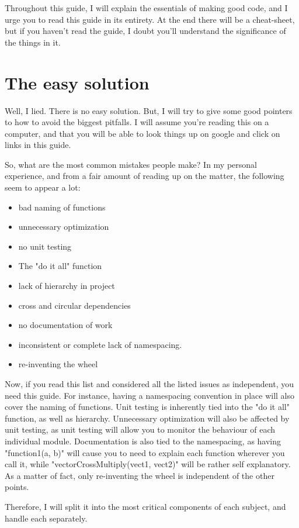 \documentclass[10pt,a4paper]{article}
\begin{document}
Throughout this guide, I will explain the essentials of making good code, and I urge you to read this guide in its entirety. At the end there will be a cheat-sheet, but if you haven't read the guide, I doubt you'll understand the significance of the things in it. 

\section{The easy solution}
Well, I lied. There is no easy solution. But, I will try to give some good pointers to how to avoid the biggest pitfalls. I will assume you're reading this on a computer, and that you will be able to look things up on google and click on links in this guide. 

So, what are the most common mistakes people make? In my personal experience, and from a fair amount of reading up on the matter, the following seem to appear a lot:

\begin{itemize}
\item bad naming of functions
\item unnecessary optimization
\item no unit testing
\item The "do it all" function
\item lack of hierarchy in project
\item cross and circular dependencies
\item no documentation of work
\item inconsistent or complete lack of namespacing.
\item re-inventing the wheel
\end{itemize}


Now, if you read this list and considered all the listed issues as independent, you need this guide. For instance, having a namespacing convention in place will also cover the naming of functions. Unit testing is inherently tied into the "do it all" function, as well as hierarchy. Unnecessary optimization will also be affected by unit testing, as unit testing will allow you to monitor the behaviour of each individual module. Documentation is also tied to the namespacing, as having "function1(a, b)" will cause you to need to explain each function wherever you call it, while "vectorCrossMultiply(vect1, vect2)" will be rather self explanatory. As a matter of fact, only re-inventing the wheel is independent of the other points.

Therefore, I will split it into the most critical components of each subject, and handle each separately.
\end{document}
